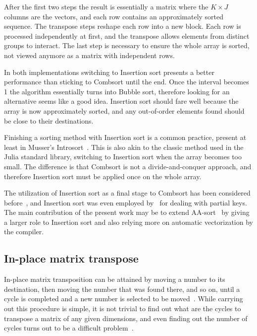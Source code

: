 \documentclass{juliacon}
\begin{document}
After the first two steps the result is essentially a matrix where the $K\times J$ columns are the vectors, and each row contains an approximately sorted sequence. The transpose steps reshape each row into a new block. Each row is processed independently at first, and the transpose allows elements from distinct groups to interact. The last step is necessary to ensure the whole array is sorted, not viewed anymore as a matrix with independent rows.

In both implementations switching to Insertion sort presents a better performance than sticking to Combsort until the end. Once the interval becomes 1 the algorithm essentially turns into Bubble sort, therefore looking for an alternative seems like a good idea. Insertion sort should fare well because the array is now approximately sorted, and any out-of-order elements found should be close to their destinations.

Finishing a sorting method with Insertion sort is a common practice, present at least in Musser's Introsort~\cite{musser1997introspective}. This is also akin to the classic method used in the Julia standard library, switching to Insertion sort when the array becomes too small. The difference is that Combsort is not a divide-and-conquer approach, and therefore Insertion sort must be applied once on the whole array.

The utilization of Insertion sort as a final stage to Combsort has been considered before~\cite{combwiki,INCERPI198737}, and Insertion sort was even employed by~\cite{DBLP:journals/pvldb/InoueT15} for dealing with partial keys. The main contribution of the present work may be to extend AA-sort~\cite{DBLP:conf/IEEEpact/InoueMKN07,DBLP:journals/pvldb/InoueT15} by giving a larger role to Insertion sort and also relying more on automatic vectorization by the compiler.

\subsection{In-place matrix transpose}
%
In-place matrix transposition can be attained by moving a number to its destination, then moving the number that was found there, and so on, until a cycle is completed and a new number is selected to be moved~\cite{10.1093/comjnl/2.1.47}. While carrying out this procedure is simple, it is not trivial to find out what are the cycles to transpose a matrix of any given dimensions, and even finding out the number of cycles turns out to be a difficult problem~\cite[1.3.3-12]{DBLP:books/lib/Knuth97}.
\end{document}
